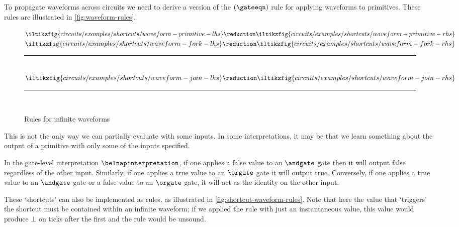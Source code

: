 \documentclass{lmcs}
\begin{document}
To propagate waveforms across circuits we need to derive a version of the
\((\gateeqn)\) rule for applying waveforms to primitives.
These rules are illustrated in \autoref{fig:waveform-rules}.

\begin{figure}
    \centering
    \(
    \iltikzfig{circuits/examples/shortcuts/waveform-primitive-lhs}
    \reduction
    \iltikzfig{circuits/examples/shortcuts/waveform-primitive-rhs}
    \)
    \quad
    \(
    \iltikzfig{circuits/examples/shortcuts/waveform-fork-lhs}
    \reduction
    \iltikzfig{circuits/examples/shortcuts/waveform-fork-rhs}
    \)
    \\[0.25em]
    \rule{\textwidth}{0.1mm}
    \\[0.5em]
    \(
    \iltikzfig{circuits/examples/shortcuts/waveform-join-lhs}
    \reduction
    \iltikzfig{circuits/examples/shortcuts/waveform-join-rhs}
    \)
    \\[0.25em]
    \rule{\textwidth}{0.1mm}
    \\[0.5em]
    \caption{Rules for infinite waveforms}
    \label{fig:waveform-rules}
\end{figure}

This is not the only way we can partially evaluate with some inputs.
In some interpretations, it may be that we learn something about the output of
a primitive with only some of the inputs specified.

\begin{exa}
    In the gate-level interpretation \(\belnapinterpretation\), if one applies a
    false value to an \(\andgate\) gate then it will output false regardless of
    the other input.
    Similarly, if one applies a true value to an \(\orgate\) gate it will output
    true.
    Conversely, if one applies a true value to an \(\andgate\) gate or a false
    value to an \(\orgate\) gate, it will act as the identity on the other
    input.
\end{exa}

These `shortcuts' can also be implemented as rules, as illustrated in
\autoref{fig:shortcut-waveform-rules}.
Note that here the value that `triggers' the shortcut must be contained within
an infinite waveform; if we applied the rule with just an instantaneous value,
this value would produce \(\bot\) on ticks after the first and the rule would
be unsound.
\end{document}
